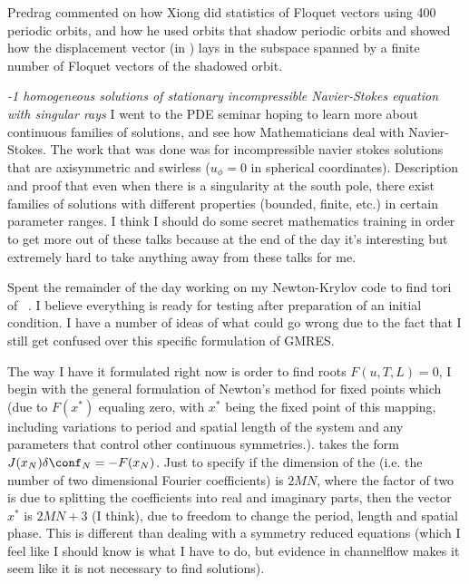 \begin{description}
{\begin{description}
Predrag commented on how Xiong did statistics of Floquet vectors using 400 periodic orbits,
and how he used orbits that shadow periodic orbits and showed how the displacement vector (in {\statesp})
lays in the subspace spanned by a finite number of Floquet vectors of the shadowed orbit.

\item[PDE seminar: Xukai Yan]
\textit{-1 homogeneous solutions of stationary incompressible Navier-Stokes equation with singular rays}
I went to the PDE seminar hoping to learn more about continuous families of solutions, and see
how Mathematicians deal with Navier-Stokes. The work that was done was for incompressible navier stokes
solutions that are axisymmetric and swirless ($u_\phi = 0 $ in spherical coordinates). Description and proof
that even when there is a singularity at the south pole, there exist families of solutions with different
properties (bounded, finite, etc.) in certain parameter ranges. I think I should do some secret mathematics
training in order to get more out of these talks because at the end of the day it's interesting but extremely
hard to take anything away from these talks for me.

\item[ks tori]
Spent the remainder of the day working on my Newton-Krylov code to find tori of \KS\ . I believe everything
is ready for testing after preparation of an initial condition. I have a number of ideas of what could go
wrong due to the fact that I still get confused over this specific formulation of GMRES.

The way I have it formulated right now is order to find roots $F(u,T,L) = 0$, I begin with the general formulation
of Newton's method for fixed points which (due to $F(x^*)$ equaling zero, with $x^*$ being the fixed point of this mapping, including
variations to period and spatial length of the system and any parameters that control other continuous symmetries.).
takes the form $J(x_N) \delta \conf_N = -F(x_N)$. Just to specify if the dimension of the {\statesp} (i.e. the number
of two dimensional Fourier coefficients) is $2MN$, where the factor of two is due to splitting the coefficients into
real and imaginary parts, then the vector $x^*$ is $2MN + 3$ (I think), due to freedom to change the period, length and
spatial phase. This is different than dealing with a symmetry reduced equations (which I feel like I should know is what I have
to do, but evidence in channelflow makes it seem like it is not necessary to find solutions).


\end{description}}
\end{description}

